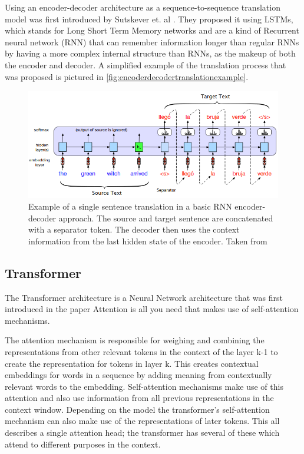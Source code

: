 Using an encoder-decoder architecture as a sequence-to-sequence translation model was first introduced by Sutskever et. al \cite{sutskever2014sequencesequencelearningneural}.
They proposed it using LSTMs, which stands for Long Short Term Memory networks and are a kind of Recurrent neural network (RNN) that can remember information longer than regular RNNs by having a more complex internal structure than RNNs, as the makeup of both the encoder and decoder. 
A simplified example of the translation process that was proposed is pictured in \autoref{fig:encoderdecodertranslationexample}.
\begin{figure}
    \centering
    \includegraphics[width=0.5\linewidth]{Latex//sections//images/encoderdecodertranslation.png}
    \caption{Example of a single sentence translation in a basic RNN encoder-decoder approach. The source and target sentence are concatenated with a separator token. The decoder then uses the context information from the last hidden state of the encoder. Taken from \cite{jm3}} 
    \label{fig:encoderdecodertranslationexample}
\end{figure}


\subsection{Transformer}
The Transformer architecture is a Neural Network architecture that was first introduced in the paper Attention is all you need \cite{vaswani2023attentionneed} that makes use of self-attention mechanisms. 

The attention mechanism is responsible for weighing and combining the representations from other relevant tokens in the context of the layer k-1 to create the representation for tokens in layer k. This creates contextual embeddings for words in a sequence by adding meaning from contextually relevant words to the embedding. 
Self-attention mechanisms make use of this attention and also use information from all previous representations in the context window. Depending on the model the transformer's self-attention mechanism can also make use of the representations of later tokens. This all describes a single attention head; the transformer has several of these which attend to different purposes in the context.

